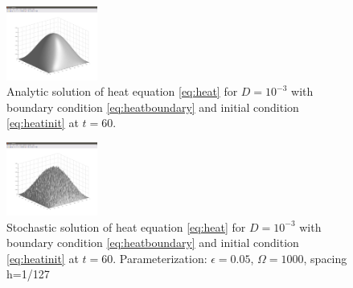 \begin{figure}
\centering
\includegraphics[trim = 15mm 0mm 10mm 35mm, clip, width=3cm,width=\textwidth]{images/diff_analytic.png}
\caption{Analytic solution of heat equation \eqref{eq:heat} for $D=10^{-3}$ with boundary condition \eqref{eq:heatboundary} and initial condition \eqref{eq:heatinit} at $t=60$.}
\label{fig:diff_analytic}
\end{figure}

\begin{figure}
\centering
\includegraphics[trim = 15mm 0mm 10mm 35mm, clip, width=3cm,width=\textwidth]{images/diff_stoch.png}
\caption{Stochastic solution of heat equation \eqref{eq:heat} for $D=10^{-3}$ with boundary condition \eqref{eq:heatboundary} and initial condition \eqref{eq:heatinit} at $t=60$. Parameterization: $\epsilon = 0.05$, $\Omega = 1000$, spacing h=1/127}
\label{fig:diff_stoch}
\end{figure}



